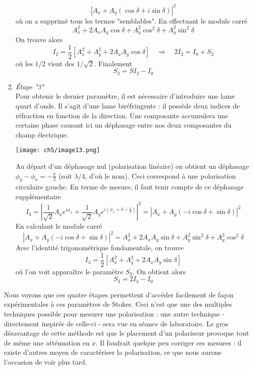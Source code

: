 \begin{enumerate}
\begin{equation}
	|A_x + A_y(\cos\delta +i\sin\delta)|^2
	\end{equation}
	où on a supprimé tous les termes "semblables". En effectuant le module carré
	\begin{equation}
	A_x^2+2A_xA_y\cos\delta + A_y^2\cos^2\delta + A_y^2\sin^2\delta  
	\end{equation}
	On trouve alors
	\begin{equation}
	I_2 = \frac{1}{2}\left[A_x^2+A_y^2+2A_xA_y\cos\delta\right]\quad \Rightarrow\quad 2I_2 = 
	I_0+S_2
	\end{equation}
	où les $1/2$ vient des $1/\sqrt{2}$. Finalement
	\begin{equation}
	S_2 = SI_2 - I_0
	\end{equation}
	\item \textit{Étape "3"}\\
	Pour obtenir le dernier paramètre, il est nécessaire d'introduire une lame quart d'onde. Il 
	s'agit d'une lame biréfringente : il possède deux indices de réfraction en fonction de la 
	direction. Une composante accumulera une certaine phase causant ici un déphasage entre nos 
	deux composantes du champ électrique. 
	\begin{center}
	\texttt{[image: ch5/image13.png]}
	\end{center}	
	Au départ d'un déphasage nul (polarisation linéaire) 
	on obtient  un déphasage $\phi_y-\phi_x=-\frac{\pi}{2}$ (soit $\lambda/4$, d'où le nom).  
	Ceci correspond à une polarisation circulaire gauche. En terme de mesure, il faut tenir 
	compte de ce déphasage supplémentaire
	\begin{equation}
	I_3 = \left|\dfrac{1}{\sqrt{2}}A_xe^{i\phi_x}+\dfrac{1}{\sqrt{2}}A_ye^{i\left(\phi_x+\delta-
	\frac{\pi}{2}\right)}\right|^2 = |A_x + A_y(-i\cos\delta +\sin\delta)|^2
	\end{equation}
	En calculant le module carré
	\begin{equation}
	|A_x + A_y(-i\cos\delta +\sin\delta)|^2 = A_x^2+2A_xA_y\sin\delta + A_y^2\sin^2\delta +A_y^2
	\cos^2\delta
	\end{equation}
	Avec l'identité trigonométrique fondamentale, on trouve
	\begin{equation}
	I_3 = \frac{1}{2}[A_x^2+A_y^2+2A_xA_y\sin\delta]
	\end{equation}
	où l'on voit apparaître le paramètre $S_3$. On obtient alors
	\begin{equation}
	S_3 = 2I_3-I_0
	\end{equation}
	\end{enumerate}
	Nous voyons que ces quatre étapes permettent d'accéder facilement de façon expérimentales à ces 
	paramètres de Stokes. Ceci n'est que une des multiples techniques possible pour mesurer une 
	polarisation : une autre technique - directement inspirée de celle-ci - sera vue en séance de 
	laboratoire. Le gros désavantage de cette méthode est que le placement d'un polariseur provoque 
	tout de même une atténuation en $x$. Il faudrait quelque peu corriger ces mesures : il existe 
	d'autres moyen de caractériser la polarisation, ce que nous aurons l'occasion de voir plus tard.
	
